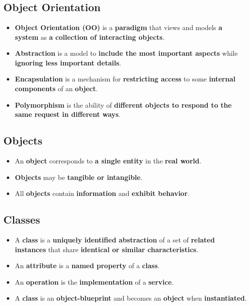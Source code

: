 \documentclass[16pt]{article}
\begin{document}
    \section*{}

    \subsection*{Object Orientation}
    \begin{itemize}
        \item \textbf{Object Orientation (OO)} is a \textbf{paradigm} that views and models \textbf{a system} as \textbf{a collection of interacting objects}.
        \item \textbf{Abstraction} is a model to \textbf{include the most important aspects} while \textbf{ignoring less important details}.
        \item \textbf{Encapsulation} is a mechanism for \textbf{restricting access} to some \textbf{internal components} of an \textbf{object}.
        \item \textbf{Polymorphism} is the ability of \textbf{different objects to respond to the same request in different ways}.
    \end{itemize}

    \subsection*{Objects}
    \begin{itemize}
        \item An \textbf{object} corresponds to \textbf{a single entity} in the \textbf{real world}.
        \item \textbf{Objects} may be \textbf{tangible or intangible}.
        \item All \textbf{objects} contain \textbf{information} and \textbf{exhibit behavior}.
    \end{itemize}

    \subsection*{Classes}
    \begin{itemize}
        \item A \textbf{class} is a \textbf{uniquely identified abstraction} of a set of \textbf{related instances} that share \textbf{identical or similar characteristics}.
        \item An \textbf{attribute} is a \textbf{named property} of a \textbf{class}.
        \item An \textbf{operation} is the \textbf{implementation} of a \textbf{service}.
        \item A \textbf{class} is an \textbf{object-blueprint} and becomes an \textbf{object} when \textbf{instantiated}.
    \end{itemize}
    
\end{document}
